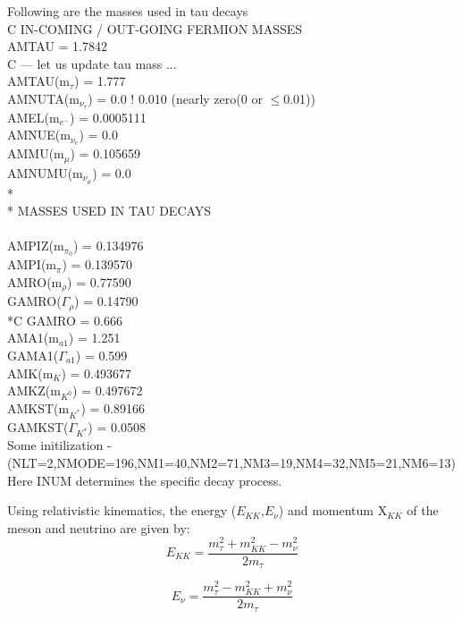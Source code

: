 \documentclass[12pt]{article}
\begin{document}
Following are the masses used in tau decays \\
C IN-COMING / OUT-GOING  FERMION MASSES\\
      AMTAU  = 1.7842\\
C --- let us update tau mass ...\\
      AMTAU(m$_\tau$)        = 1.777\\
      AMNUTA(m$_{\nu_\tau}$) = 0.0 $!$ 0.010   (nearly zero(0 or $\leq$0.01))\\
      AMEL(m$_{e^-}$)        = 0.0005111\\
      AMNUE(m$_{\nu_e}$)     = 0.0\\
      AMMU(m$_\mu$)          = 0.105659 \\
      AMNUMU(m$_{\nu_\mu}$)  = 0.0\\
*\\
* MASSES USED IN TAU DECAYS\\
\\
      AMPIZ(m$_{\pi_0}$)     = 0.134976\\
      AMPI(m$_\pi$)          = 0.139570\\
      AMRO(m$_\rho$)         = 0.77590\\
      GAMRO($\Gamma_\rho$)   = 0.14790\\
*C    GAMRO                  = 0.666\\
      AMA1(m$_{a1}$)         = 1.251\\
      GAMA1($\Gamma_{a1}$)   = 0.599\\
      AMK(m$_K$)             = 0.493677\\
      AMKZ(m$_{K^0}$)        = 0.497672\\
      AMKST(m$_{K^*}$)       = 0.89166\\
      GAMKST($\Gamma_{K^*}$) = 0.0508\\

Some initilization - \\

(NLT=2,NMODE=196,NM1=40,NM2=71,NM3=19,NM4=32,NM5=21,NM6=13)\\

Here INUM determines the specific decay process. 

Using relativistic kinematics, the energy ($E_{KK}$,$E_\nu$) and momentum X$_{KK}$ of the meson and neutrino are given by:\\
\[E_{KK} = \frac{m_\tau^2+m_{KK}^2-m_\nu^2}{2m_\tau}\]

\[E_{\nu} = \frac{m_\tau^2-m_{KK}^2+m_\nu^2}{2m_\tau}\]
\end{document}
